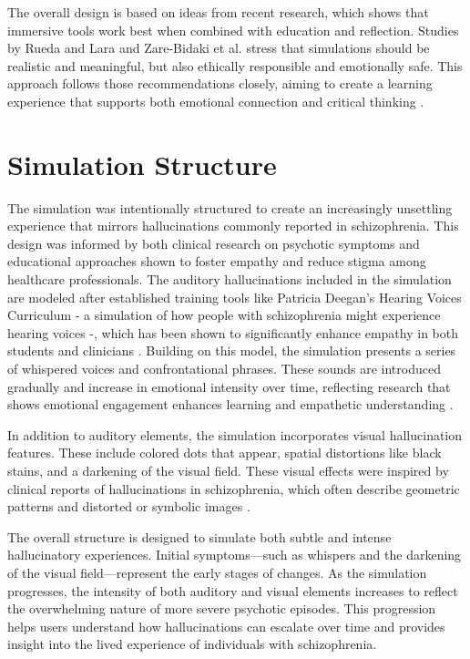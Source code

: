 The overall design is based on ideas from recent research, which shows that immersive tools work best when combined with education and reflection. Studies by Rueda and Lara and Zare-Bidaki et al. stress that simulations should be realistic and meaningful, but also ethically responsible and emotionally safe. This approach follows those recommendations closely, aiming to create a learning experience that supports both emotional connection and critical thinking \cite{Rueda2020,Zare-Bidaki2022}.

\section{Simulation Structure}

The simulation was intentionally structured to create an increasingly unsettling experience that mirrors hallucinations commonly reported in schizophrenia. This design was informed by both clinical research on psychotic symptoms and educational approaches shown to foster empathy and reduce stigma among healthcare professionals. The auditory hallucinations included in the simulation are modeled after established training tools like Patricia Deegan’s Hearing Voices Curriculum - a simulation of how people with schizophrenia might experience hearing voices -, which has been shown to significantly enhance empathy in both students and clinicians \cite{Hsia2022}. Building on this model, the simulation presents a series of whispered voices and confrontational phrases. These sounds are introduced gradually and increase in emotional intensity over time, reflecting research that shows emotional engagement enhances learning and empathetic understanding \cite{Skoy2016}.

\vspace{1em}

In addition to auditory elements, the simulation incorporates visual hallucination features. These include colored dots that appear, spatial distortions like black stains, and a darkening of the visual field. These visual effects were inspired by clinical reports of hallucinations in schizophrenia, which often describe geometric patterns and distorted or symbolic images \cite{Silverstein2021,Vanommen2019}.

The overall structure is designed to simulate both subtle and intense hallucinatory experiences. Initial symptoms—such as whispers and the darkening of the visual field—represent the early stages of changes. As the simulation progresses, the intensity of both auditory and visual elements increases to reflect the overwhelming nature of more severe psychotic episodes. This progression helps users understand how hallucinations can escalate over time and provides insight into the lived experience of individuals with schizophrenia.


